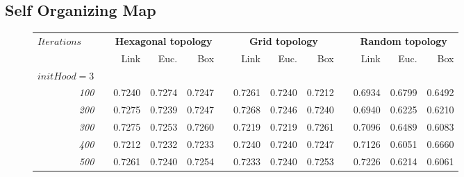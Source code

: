 \documentclass[a4paper, 10pt]{article}
\begin{document}
  \subsection{Self Organizing Map}
  \Blindtext



  \begin{figure}[h]
    \centering
    \hfill
    \begin{tabular}{@{}rcrrrcrrrcrrr@{}}
      \toprule
      \multicolumn{1}{l}{\multirow{2}{*}{$Iterations$}} & \phantom{a} &%
        \multicolumn{3}{c}{\textbf{Hexagonal topology}} & \phantom{a} &
        \multicolumn{3}{c}{\textbf{Grid topology}}      & \phantom{a} &
        \multicolumn{3}{c}{\textbf{Random topology}} \\
      \cmidrule{3-5} \cmidrule{7-9} \cmidrule{11-13}
      && Link & Euc. & Box && Link & Euc. & Box && Link & Euc. & Box  \\
      \midrule
      $initHood = 3$ \\
      \emph{100}  &&  0.7240  &  0.7274  &  0.7247  &&  0.7261  &  0.7240  &  0.7212  &&  0.6934  &  0.6799  &  0.6492 \\
      \emph{200}  &&  0.7275  &  0.7239  &  0.7247  &&  0.7268  &  0.7246  &  0.7240  &&  0.6940  &  0.6225  &  0.6210 \\
      \emph{300}  &&  0.7275  &  0.7253  &  0.7260  &&  0.7219  &  0.7219  &  0.7261  &&  0.7096  &  0.6489  &  0.6083 \\
      \emph{400}  &&  0.7212  &  0.7232  &  0.7233  &&  0.7240  &  0.7240  &  0.7247  &&  0.7126  &  0.6051  &  0.6660 \\
      \emph{500}  &&  0.7261  &  0.7240  &  0.7254  &&  0.7233  &  0.7240  &  0.7253  &&  0.7226  &  0.6214  &  0.6061 \\

\end{tabular}
\end{figure}
\end{document}
